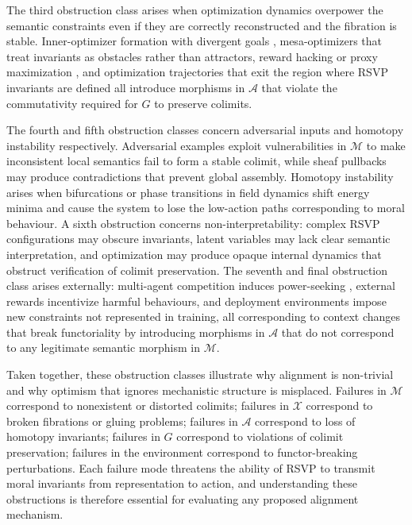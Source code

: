 \documentclass[12pt]{article}
\theoremstyle{definition}
\begin{document}
The third obstruction class arises when optimization dynamics overpower the
semantic constraints even if they are correctly reconstructed and the fibration
is stable. Inner-optimizer formation with divergent goals \citep{hubinger2019risks},
mesa-optimizers that treat invariants as obstacles rather than attractors, reward
hacking or proxy maximization \citep{krakovna2020}, and optimization trajectories
that exit the region where RSVP invariants are defined all introduce morphisms
in $\mathcal{A}$ that violate the commutativity required for $G$ to preserve
colimits.

The fourth and fifth obstruction classes concern adversarial inputs and homotopy
instability respectively. Adversarial examples exploit vulnerabilities in
$\mathcal{M}$ to make inconsistent local semantics fail to form a stable
colimit, while sheaf pullbacks may produce contradictions that prevent global
assembly. Homotopy instability arises when bifurcations or phase transitions in
field dynamics \citep{strogatz2018} shift energy minima and cause the system to
lose the low-action paths corresponding to moral behaviour. A sixth obstruction
concerns non-interpretability: complex RSVP configurations may obscure
invariants, latent variables may lack clear semantic interpretation, and
optimization may produce opaque internal dynamics that obstruct verification of
colimit preservation. The seventh and final obstruction class arises externally:
multi-agent competition induces power-seeking \citep{bostrom2012superintelligent},
external rewards incentivize harmful behaviours, and deployment environments
impose new constraints not represented in training, all corresponding to context
changes that break functoriality by introducing morphisms in $\mathcal{A}$ that
do not correspond to any legitimate semantic morphism in $\mathcal{M}$.

Taken together, these obstruction classes illustrate why alignment is non-trivial
and why optimism that ignores mechanistic structure is misplaced. Failures in
$\mathcal{M}$ correspond to nonexistent or distorted colimits; failures in
$\mathcal{X}$ correspond to broken fibrations or gluing problems; failures in
$\mathcal{A}$ correspond to loss of homotopy invariants; failures in $G$
correspond to violations of colimit preservation; failures in the environment
correspond to functor-breaking perturbations. Each failure mode threatens the
ability of RSVP to transmit moral invariants from representation to action, and
understanding these obstructions is therefore essential for evaluating any
proposed alignment mechanism.
\end{document}

